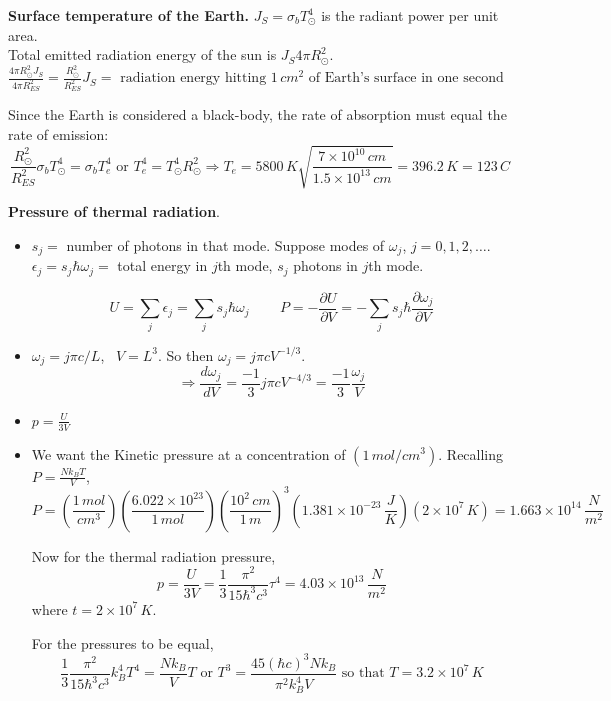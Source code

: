  \textbf{Surface temperature of the Earth.}  
$J_S = \sigma_b T_{\odot}^4$ is the radiant power per unit area.  \\
Total emitted radiation energy of the sun is $J_S 4\pi R_{\odot}^2$.   \quad \\
$\frac{4 \pi R_{\odot}^2 J_S }{ 4\pi R_{ES}^2} = \frac{R_{\odot}^2}{R_{ES}^2} J_S = \text{ radiation energy hitting $1 \, cm^2$ of Earth's surface in one second }$  

Since the Earth is considered a black-body, the rate of absorption must equal the rate of emission: 
\[
\frac{R_{\odot}^2}{R_{ES}^2} \sigma_b T_{\odot}^4 = \sigma_b T_e^4 \text{ or } T_e^4 = T_{\odot}^4 R_{\odot}^2 \Longrightarrow T_e = 5800 \, K \sqrt{ \frac{ 7 \times 10^{10}\, cm}{ 1.5 \times 10^{13} \, cm} } = 396.2 \, K = 123 \, C
\]




 \textbf{Pressure of thermal radiation}.  \begin{itemize}
\item[(a)] $s_j = $ number of photons in that mode.  Suppose modes of $\omega_j$, $j=0,1,2,\dots$.  \\
$\epsilon_j = s_j \hbar \omega_j = $ total energy in $j$th mode, $s_j$ photons in $j$th mode.  

\[
U = \sum_j \epsilon_j = \sum_j s_j \hbar \omega_j \quad \quad \, P = - \frac{ \partial U}{ \partial V} = - \sum_j s_j \hbar \frac{ \partial \omega_j}{\partial V}
\]
\item[(b)] $\omega_j = j\pi c/L$, \, $V= L^3$.  So then $\omega_j = j\pi c V^{-1/3}$.  
\[
\Longrightarrow \frac{d\omega_j}{dV} = \frac{-1}{3} j \pi c V^{-4/3} = \frac{-1}{3}  \frac{\omega_j}{V}
\]
\item[(c)] $p = \frac{U}{3V}$   
\item[(d)] We want the Kinetic pressure at a concentration of $(1 \, mol/cm^3)$.  Recalling $P =  \frac{Nk_B T}{V}$, 
\[
P = \left( \frac{ 1 \, mol }{ cm^3} \right) \left( \frac{ 6.022 \times 10^{23} }{ 1\, mol } \right)\left( \frac{ 10^2 \, cm}{1 \, m }\right)^3 \left( 1.381 \times 10^{-23} \, \frac{J}{K} \right) (2 \times 10^7 \, K) = 1.663 \times 10^{14} \, \frac{N}{m^2}
\]

Now for the thermal radiation pressure,
\[
p = \frac{U}{3V} = \frac{1}{3} \frac{ \pi^2}{ 15 \hbar^3 c^3 } \tau^4 = 4.03 \times 10^{13} \, \frac{N}{m^2}
\]
where $t = 2\times 10^7 \, K$.  

For the pressures to be equal, 
\[
\frac{1}{3} \frac{ \pi^2 }{15 \hbar^3 c^3} k_B^4 T^4 = \frac{Nk_B}{V} T \text{ or } T^3 = \frac{45 ( \hbar c)^3 Nk_B }{ \pi^2 k_B^4 V } \text{ so that } \boxed{ T = 3.2 \times 10^7 \, K} 
\]
\end{itemize}

